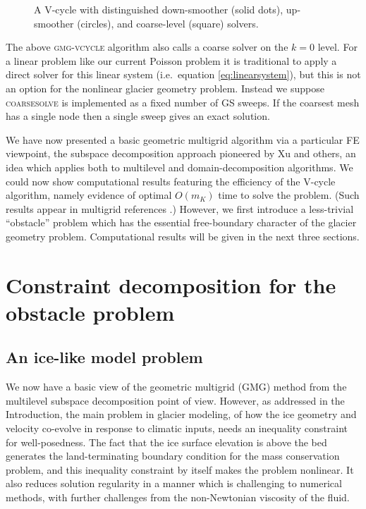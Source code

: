 \documentclass[letterpaper,final,12pt,reqno]{amsart}
\theoremstyle{claim}
\numberwithin{equation}{section}
\numberwithin{figure}{section}
\numberwithin{table}{section}
\begin{document}
\begin{figure}

\caption{A V-cycle with distinguished down-smoother (solid dots), up-smoother (circles), and coarse-level (square) solvers.}
\label{fig:vcycle}
\end{figure}

The above \textsc{gmg-vcycle} algorithm also calls a coarse solver on the $k=0$ level.  For a linear problem like our current Poisson problem it is traditional to apply a direct solver for this linear system (i.e.~equation \eqref{eq:linearsystem}), but this is not an option for the nonlinear glacier geometry problem.  Instead we suppose \textsc{coarsesolve} is implemented as a fixed number of GS sweeps.  If the coarsest mesh has a single node then a single sweep gives an exact solution.

We have now presented a basic geometric multigrid algorithm via a particular FE viewpoint, the subspace decomposition approach pioneered by Xu \cite{Xu1992} and others, an idea which applies both to multilevel and domain-decomposition algorithms.  We could now show computational results featuring the efficiency of the V-cycle algorithm, namely evidence of optimal $O(m_K)$ time to solve the problem.  (Such results appear in multigrid references \cite{Briggsetal2000,Bueler2021,Elmanetal2014,Trottenbergetal2001}.)  However, we first introduce a less-trivial ``obstacle'' problem which has the essential free-boundary character of the glacier geometry problem.  Computational results will be given in the next three sections.


\section{Constraint decomposition for the obstacle problem} \label{sec:obstacle}

\subsection*{An ice-like model problem}  We now have a basic view of the geometric multigrid (GMG) method from the multilevel subspace decomposition point of view.  However, as addressed in the Introduction, the main problem in glacier modeling, of how the ice geometry and velocity co-evolve in response to climatic inputs, needs an inequality constraint for well-posedness.  The fact that the ice surface elevation is above the bed generates the land-terminating boundary condition for the mass conservation problem, and this inequality constraint by itself makes the problem nonlinear.  It also reduces solution regularity in a manner which is challenging to numerical methods, with further challenges from the non-Newtonian viscosity of the fluid.
\end{document}
